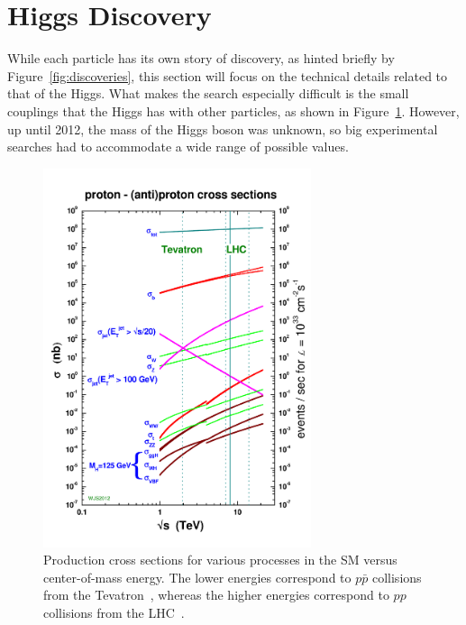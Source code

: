 \section{Higgs Discovery\label{sec:discovery}}

While each particle has its own story of discovery, as hinted briefly by Figure~\ref{fig:discoveries},
this section will focus on the technical details related to that of the Higgs.
What makes the search especially difficult is the
small couplings that the Higgs has with other particles, as shown in Figure~\ref{fig:crosssections}.
However, up until 2012, the mass of the Higgs boson was unknown, so big experimental searches
had to accommodate a wide range of possible values.

\begin{figure}[ht]
 \begin{center}
    \includegraphics[width=0.70\textwidth]{figures/intro/crosssections2012_v5.pdf}
      \end{center}
\caption{Production cross sections for various processes in the SM versus center-of-mass energy.
The lower energies correspond to $p\bar{p}$ collisions from the Tevatron~\cite{Group:1984bk}, whereas
the higher energies correspond to $pp$ collisions from the LHC~\cite{cern-jinst-lhc}.}
\label{fig:crosssections}
\end{figure}

